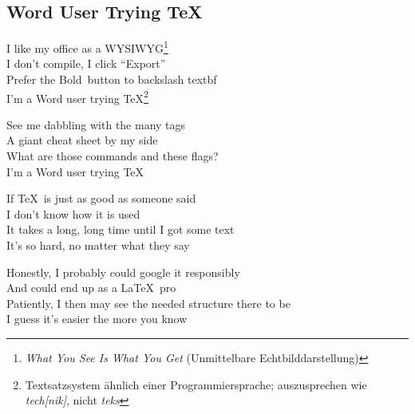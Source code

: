 \subsection[Word User Trying \TeX ]{Word User Trying \TeX}

 I like my office as a WYSIWYG\footnote{\emph{What You See Is What You Get} (Unmittelbare Echtbilddarstellung)} \\
 I don’t compile, I click “Export” \\
 Prefer the \glqq Bold\grqq \ button to backslash textbf \\
I’m a Word user trying \TeX\footnote{Textsatzsystem ähnlich einer Programmiersprache; auszusprechen wie \textit{tech[nik]}, nicht \textit{teks}}  \\


See me dabbling with the many tags \\
A giant cheat sheet by my side \\
What are those commands and these flags? \\
I’m a Word user trying \TeX \\


If \TeX \ is just as good as someone said \\
I don’t know how it is used \\
It takes a long, long time until I got some text \\
It’s so hard, no matter what they say \\


\pagebreak

Honestly, I probably could google it responsibly \\
And could end up as a \LaTeX \ pro \\
Patiently, I then may see the needed structure there to be \\
I guess it's easier the more you know \\

